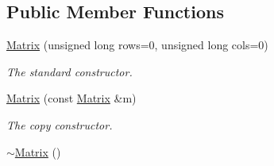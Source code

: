 \subsection*{Public Member Functions}
\begin{DoxyCompactItemize}
\item 
\hyperlink{class_matrix_a53f60218c002f2bb454695a1fc35c5d3}{Matrix} (unsigned long rows=0, unsigned long cols=0)
\begin{DoxyCompactList}\small\item\em The standard constructor. \end{DoxyCompactList}\item 
\hyperlink{class_matrix_a3796b4f32dc8e11f908a90fd3dd39c45}{Matrix} (const \hyperlink{class_matrix}{Matrix} \&m)
\begin{DoxyCompactList}\small\item\em The copy constructor. \end{DoxyCompactList}\item 
\hyperlink{class_matrix_a91aa704de674203e96aece9e1955ccd3}{$\sim$\+Matrix} ()\hypertarget{class_matrix_a91aa704de674203e96aece9e1955ccd3}{}\label{class_matrix_a91aa704de674203e96aece9e1955ccd3}


\end{DoxyCompactItemize}

